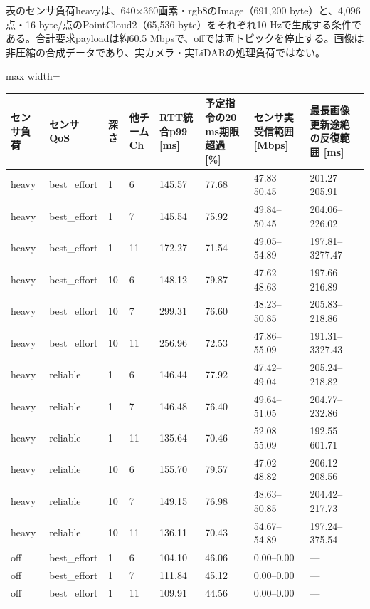 \documentclass[a4paper,10pt]{ltjsarticle}
\begin{document}
表のセンサ負荷heavyは、640×360画素・rgb8のImage（691,200 byte）と、4,096点・16 byte/点のPointCloud2（65,536 byte）をそれぞれ10 Hzで生成する条件である。合計要求payloadは約60.5 Mbpsで、offでは両トピックを停止する。画像は非圧縮の合成データであり、実カメラ・実LiDARの処理負荷ではない。

\begin{center}\small\begin{adjustbox}{max width=\linewidth}
\begin{tabular}{llllllll}\toprule
センサ負荷 & センサQoS & 深さ & 他チームCh & RTT統合p99 [ms] & 予定指令の20 ms期限超過 [\%] & センサ実受信範囲 [Mbps] & 最長画像更新途絶の反復範囲 [ms]\\
\midrule
heavy & best\_effort & 1 & 6 & 145.57 & 77.68 & 47.83–50.45 & 201.27–205.91\\
heavy & best\_effort & 1 & 7 & 145.54 & 75.92 & 49.84–50.45 & 204.06–226.02\\
heavy & best\_effort & 1 & 11 & 172.27 & 71.54 & 49.05–54.89 & 197.81–3277.47\\
heavy & best\_effort & 10 & 6 & 148.12 & 79.87 & 47.62–48.63 & 197.66–216.89\\
heavy & best\_effort & 10 & 7 & 299.31 & 76.60 & 48.23–50.85 & 205.83–218.86\\
heavy & best\_effort & 10 & 11 & 256.96 & 72.53 & 47.86–55.09 & 191.31–3327.43\\
heavy & reliable & 1 & 6 & 146.44 & 77.92 & 47.42–49.04 & 205.24–218.82\\
heavy & reliable & 1 & 7 & 146.48 & 76.40 & 49.64–51.05 & 204.77–232.86\\
heavy & reliable & 1 & 11 & 135.64 & 70.46 & 52.08–55.09 & 192.55–601.71\\
heavy & reliable & 10 & 6 & 155.70 & 79.57 & 47.02–48.82 & 206.12–208.56\\
heavy & reliable & 10 & 7 & 149.15 & 76.98 & 48.63–50.85 & 204.42–217.73\\
heavy & reliable & 10 & 11 & 136.11 & 70.43 & 54.67–54.89 & 197.24–375.54\\
off & best\_effort & 1 & 6 & 104.10 & 46.06 & 0.00–0.00 & —\\
off & best\_effort & 1 & 7 & 111.84 & 45.12 & 0.00–0.00 & —\\
off & best\_effort & 1 & 11 & 109.91 & 44.56 & 0.00–0.00 & —\\
\bottomrule\end{tabular}\end{adjustbox}\end{center}
\end{document}
